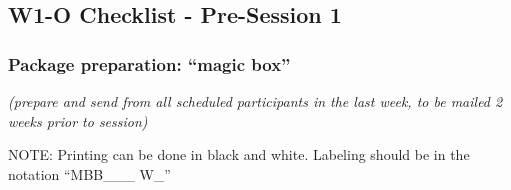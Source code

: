 \documentclass[]{book}
\begin{document}
\hypertarget{w1-o-checklist---pre-session-1}{%
\subsection{W1-O Checklist - Pre-Session 1}\label{w1-o-checklist---pre-session-1}}

\hypertarget{package-preparation-magic-box}{%
\subsubsection{Package preparation: ``magic box''}\label{package-preparation-magic-box}}

\emph{(prepare and send from all scheduled participants in the last week, to be mailed 2 weeks prior to session)}

NOTE: Printing can be done in black and white. Labeling should be in the notation ``MBB\_\_\_ W\_''
\end{document}
